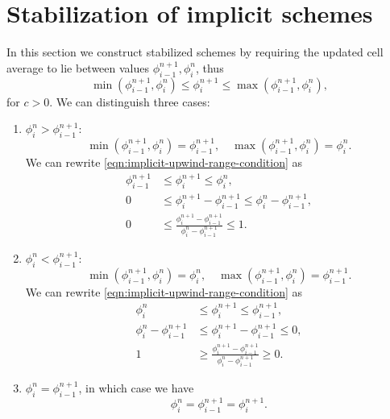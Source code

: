 \documentclass[../thesis.tex]{subfiles}
\begin{document}
\section[]{Stabilization of implicit schemes}
In this section we construct stabilized schemes by requiring the updated cell average to lie between values \(\phi_{i-1}^{n+1},\phi_{i}^{n}\), thus
\begin{equation}\label{eqn:implicit-upwind-range-condition}
    \min\left( \phi_{i-1}^{n+1},\phi_{i}^{n} \right)
    \leq
    \phi_{i}^{n+1}
    \leq
    \max\left( \phi_{i-1}^{n+1},\phi_{i}^{n} \right),
\end{equation}
for \(c > 0\). We can distinguish three cases:
\begin{enumerate}
    \item \(\phi_{i}^{n} > \phi_{i-1}^{n+1}:\)
        \[\min\left( \phi_{i-1}^{n+1},\phi_{i}^{n} \right) = \phi_{i-1}^{n+1},\quad
        \max\left( \phi_{i-1}^{n+1},\phi_{i}^{n} \right) = \phi_{i}^{n}.\]
        We can rewrite \eqref{eqn:implicit-upwind-range-condition} as
        \begin{equation*}
            \begin{split}
                \phi_{i-1}^{n+1}
                &\leq
                \phi_{i}^{n+1}
                \leq
                \phi_{i}^{n},
                \\
                0
                &\leq
                \phi_{i}^{n+1} - \phi_{i-1}^{n+1}
                \leq
                \phi_{i}^{n} - \phi_{i-1}^{n+1},
                \\
                0
                &\leq
                \frac{\phi_{i}^{n+1} - \phi_{i-1}^{n+1}}{\phi_{i}^{n} - \phi_{i-1}^{n+1}}
                \leq
                1.
            \end{split}
        \end{equation*}
    \item \(\phi_{i}^{n} < \phi_{i-1}^{n+1}:\)
        \[\min\left( \phi_{i-1}^{n+1},\phi_{i}^{n} \right) = \phi_{i}^{n},\quad
        \max\left( \phi_{i-1}^{n+1},\phi_{i}^{n} \right) = \phi_{i-1}^{n+1}.\]
        We can rewrite \eqref{eqn:implicit-upwind-range-condition} as
        \begin{equation*}
            \begin{split}
                \phi_{i}^{n}
                &\leq
                \phi_{i}^{n+1}
                \leq
                \phi_{i-1}^{n+1},
                \\
                \phi_{i}^{n} - \phi_{i-1}^{n+1}
                &\leq
                \phi_{i}^{n+1} - \phi_{i-1}^{n+1}
                \leq
                0,
                \\
                1
                &\geq
                \frac{\phi_{i}^{n+1} - \phi_{i-1}^{n+1}}{\phi_{i}^{n} - \phi_{i-1}^{n+1}}
                \geq
                0.
            \end{split}
        \end{equation*}
    \item \(\phi_{i}^{n} = \phi_{i-1}^{n+1}\), in which case we have\[\phi_{i}^{n} = \phi_{i-1}^{n+1} = \phi_{i}^{n+1}.\]
\end{enumerate}
\end{document}
